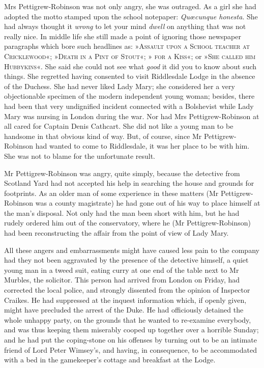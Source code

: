 Mrs Pettigrew-Robinson was not only angry, she was outraged. As a girl she had adopted the motto stamped upon the school notepaper: \textit{Quœcunque honesta}. She had always thought it \textit{wrong} to let your mind \textit{dwell} on anything that was not really nice. In middle life she still made a point of ignoring those newspaper paragraphs which bore such headlines as: »\textsc{Assault upon a School teacher at Cricklewood}«; »\textsc{Death in a Pint of Stout}«; »\textsc{ for a Kiss}«; or »\textsc{She called him Hubbykins}«. She said she could not see what \textit{good} it did you to know about such things. She regretted having consented to visit Riddlesdale Lodge in the absence of the Duchess. She had never liked Lady Mary; she considered her a very objectionable specimen of the modern independent young woman; besides, there had been that very undignified incident connected with a Bolshevist while Lady Mary was nursing in London during the war. Nor had Mrs Pettigrew-Robinson at all cared for Captain Denis Cathcart. She did not like a young man to be handsome in that obvious kind of way. But, of course, since Mr  Pettigrew-Robinson had wanted to come to Riddlesdale, it was her place to be with him. She was not to blame for the unfortunate result.

Mr Pettigrew-Robinson was angry, quite simply, because the detective from Scotland Yard had not accepted his help in searching the house and grounds for footprints. As an older man of some experience in these matters (Mr Pettigrew-Robinson was a county magistrate) he had gone out of his way to place himself at the man's disposal. Not only had the man been short with him, but he had rudely ordered him out of the conservatory, where he (Mr Pettigrew-Robinson) had been reconstructing the affair from the point of view of Lady Mary.

All these angers and embarrassments might have caused less pain to the company had they not been aggravated by the presence of the detective himself, a quiet young man in a tweed suit, eating curry at one end of the table next to Mr Murbles, the solicitor. This person had arrived from London on Friday, had corrected the local police, and strongly dissented from the opinion of Inspector Craikes. He had suppressed at the inquest information which, if openly given, might have precluded the arrest of the Duke. He had officiously detained the whole unhappy party, on the grounds that he wanted to re-examine everybody, and was thus keeping them miserably cooped up together over a horrible Sunday; and he had put the coping-stone on his offenses by turning out to be an intimate friend of Lord Peter Wimsey's, and having, in consequence, to be accommodated with a bed in the gamekeeper's cottage and breakfast at the Lodge.

